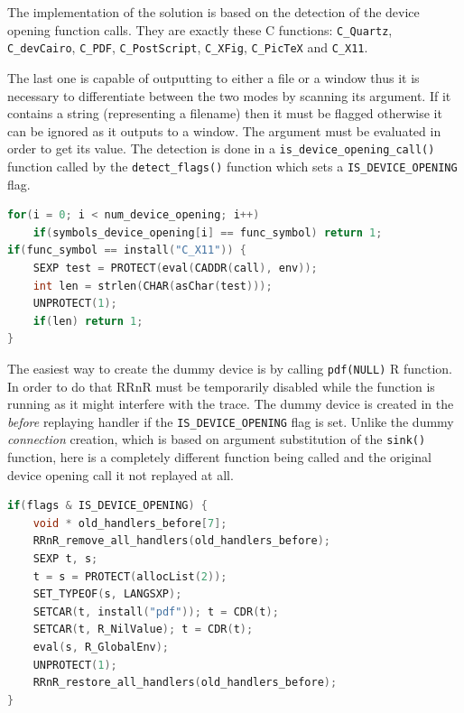 \documentclass[thesis=M,english,hidelinks]{FITthesis}[2012/10/20]
\begin{document}
		The implementation of the solution is based on the detection of the device opening function calls. They are exactly these C functions: \lstinline|C_Quartz|, \lstinline|C_devCairo|, \lstinline|C_PDF|, \lstinline|C_PostScript|, \lstinline|C_XFig|, \lstinline|C_PicTeX| and \lstinline|C_X11|.\par
		
		The last one is capable of outputting to either a file or a window thus it is necessary to differentiate between the two modes by scanning its argument. If it contains a string (representing a filename) then it must be flagged otherwise it can be ignored as it outputs to a window. The argument must be evaluated in order to get its value. The detection is done in a \lstinline|is_device_opening_call()| function called by the \lstinline|detect_flags()| function which sets a \lstinline|IS_DEVICE_OPENING| flag.\par
		
\begin{lstlisting}[style=filestyle, language=C, caption={Detection of a device opening call}]
for(i = 0; i < num_device_opening; i++)
	if(symbols_device_opening[i] == func_symbol) return 1;
if(func_symbol == install("C_X11")) {
	SEXP test = PROTECT(eval(CADDR(call), env));
	int len = strlen(CHAR(asChar(test)));
	UNPROTECT(1);
	if(len) return 1;
}
\end{lstlisting}
		
		The easiest way to create the dummy device is by calling \lstinline|pdf(NULL)| R function. In order to do that RRnR must be temporarily disabled while the function is running as it might interfere with the trace. The dummy device is created in the \emph{before} replaying handler if the \lstinline|IS_DEVICE_OPENING| flag is set. Unlike the dummy \emph{connection} creation, which is based on argument substitution of the \lstinline|sink()| function, here is a completely different function being called and the original device opening call it not replayed at all.\par
		
\begin{lstlisting}[style=filestyle, language=C, caption={Creation of the dummy graphics device}]
if(flags & IS_DEVICE_OPENING) {
	void * old_handlers_before[7];
	RRnR_remove_all_handlers(old_handlers_before);
	SEXP t, s;
	t = s = PROTECT(allocList(2));
	SET_TYPEOF(s, LANGSXP);
	SETCAR(t, install("pdf")); t = CDR(t);
	SETCAR(t, R_NilValue); t = CDR(t);
	eval(s, R_GlobalEnv);
	UNPROTECT(1);
	RRnR_restore_all_handlers(old_handlers_before);
}
\end{lstlisting}
		
\end{document}
